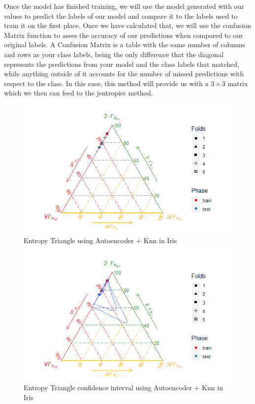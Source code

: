 Once the model has finished training, we will use the model generated with our values to predict the labels of our model and compare it to the labels used to train it on the first place. Once we have calculated that, we will use the confusion Matrix function to asses the accuracy of our predictions when compared to our original labels. A Confusion Matrix is a table with the same number of columns and rows as your class labels, being the only difference that the diagonal represents the predictions from your model and the class labels that matched, while anything outside of it accounts for the number of missed predictions with respect to the class. In this case, this method will provide us with a $3\times3$ matrix which we then can feed to the jentropies method. \par


\begin{figure}[H]
	\centering
	\includegraphics[width=\linewidth]{Figuras_tfg/ET_knn_iris_auto}
	\caption{Entropy Triangle using Autoencoder + Knn in Iris}
	\label{fig:figure_Knn_Iris_ET_Auto}
\end{figure}

\begin{figure}[H]
	\centering
	\includegraphics[width=\linewidth]{Figuras_tfg/ET_knn_iris_auto_confidence}
	\caption{Entropy Triangle confidence interval using Autoencoder + Knn in Iris}
	\label{fig:figure_Knn_Iris_ET_Auto_Confidence}
\end{figure}

